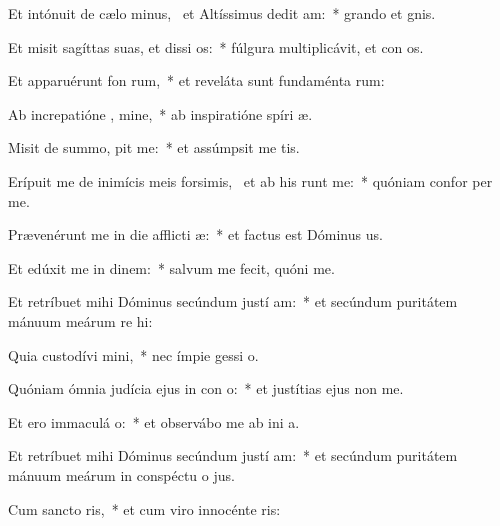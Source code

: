 \item Et intónuit de cælo minus,~\pscross{} et Altíssimus dedit  am:~* grando et  gnis.
\item Et misit sagíttas suas, et dissi os:~* fúlgura multiplicávit, et con os.
\item Et apparuérunt fon rum,~* et reveláta sunt fundaménta  rum:
\item Ab increpatióne , mine,~* ab inspiratióne spíri  æ.
\item Misit de summo,  pit me:~* et assúmpsit me   tis.
\item Erípuit me de inimícis meis forsimis,~\pscross{} et ab his  runt me:~* quóniam confor  per me.
\item Prævenérunt me in die afflicti æ:~* et factus est Dóminus  us.
\item Et edúxit me in dinem:~* salvum me fecit, quóni  me.
\item Et retríbuet mihi Dóminus secúndum justí am:~* et secúndum puritátem mánuum meárum re hi:
\item Quia custodívi  mini,~* nec ímpie gessi   o.
\item Quóniam ómnia judícia ejus in con o:~* et justítias ejus non   me.
\item Et ero immaculá  o:~* et observábo me ab ini a.
\item Et retríbuet mihi Dóminus secúndum justí am:~* et secúndum puritátem mánuum meárum in conspéctu o jus.
\item Cum sancto  ris,~* et cum viro innocénte  ris:
